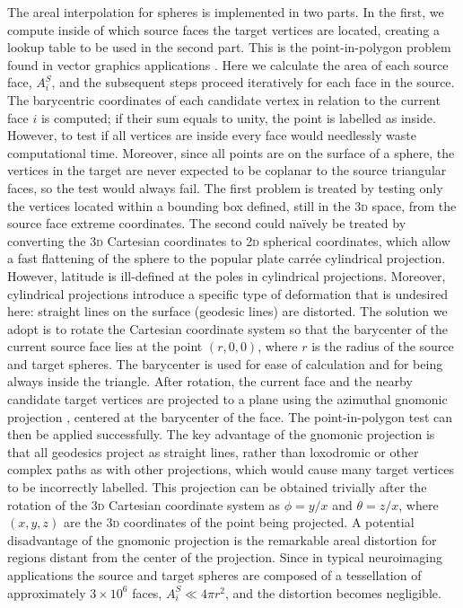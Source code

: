 The areal interpolation for spheres is implemented in two parts. In the first, we compute inside of which source faces the target vertices are located, creating a lookup table to be used in the second part. This is the point-in-polygon problem found in vector graphics applications \citep{Vince2005}. Here we calculate the area of each source face, $A^{S}_{i}$, and the subsequent steps proceed iteratively for each face in the source. The barycentric coordinates of each candidate vertex in relation to the current face $i$ is computed; if their sum equals to unity, the point is labelled as inside. However, to test if all vertices are inside every face would needlessly waste computational time. Moreover, since all points are on the surface of a sphere, the vertices in the target are never expected to be coplanar to the source triangular faces, so the test would always fail. The first problem is treated by testing only the vertices located within a bounding box defined, still in the \textsc{3d} space, from the source face extreme coordinates. The second could na\"{i}vely be treated by converting the \textsc{3d} Cartesian coordinates to \textsc{2d} spherical coordinates, which allow a fast flattening of the sphere to the popular plate carr\'{e}e cylindrical projection. However, latitude is ill-defined at the poles in cylindrical projections. Moreover, cylindrical projections introduce a specific type of deformation that is undesired here: straight lines on the surface (geodesic lines) are distorted. The solution we adopt is to rotate the Cartesian coordinate system so that the barycenter of the current source face lies at the point $(r,0,0)$, where $r$ is the radius of the source and target spheres. The barycenter is used for ease of calculation and for being always inside the triangle. After rotation, the current face and the nearby candidate target vertices are projected to a plane using the azimuthal gnomonic projection \citep{Snyder1987}, centered at the barycenter of the face. The point-in-polygon test can then be applied successfully. The key advantage of the gnomonic projection is that all geodesics project as straight lines, rather than loxodromic or other complex paths as with other projections, which would cause many target vertices to be incorrectly labelled. This projection can be obtained trivially after the rotation of the \textsc{3d} Cartesian coordinate system as $\phi=y/x$ and $\theta=z/x$, where $(x,y,z)$ are the \textsc{3d} coordinates of the point being projected. A potential disadvantage of the gnomonic projection is the remarkable areal distortion for regions distant from the center of the projection. Since in typical neuroimaging applications the source and target spheres are composed of a tessellation of approximately $3\times10^6$ faces, $A^{S}_{i} \ll 4 \pi r^2$, and the distortion becomes negligible.

